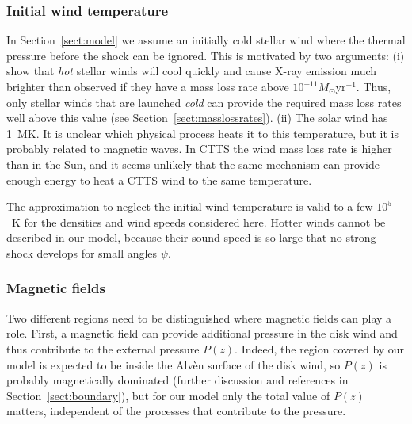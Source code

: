 \documentclass{emulateapj}
\begin{document}
\subsubsection{Initial wind temperature}
\label{sect:T_0}
In Section~\ref{sect:model} we assume an initially cold stellar wind where the thermal pressure before the shock can be ignored. This is motivated by two arguments: (i) \citet{2007IAUS..243..299M} show that {\it hot} stellar winds will cool quickly and cause X-ray emission much brighter than observed if they have a mass loss rate above $10^{-11}M_\odot\mathrm{ yr}^{-1}$. Thus, only stellar winds that are launched {\it cold} can provide the required mass loss rates well above this value (see Section~\ref{sect:masslossrates}). (ii) The solar wind has 1~MK. It is unclear which physical process heats it to this temperature, but it is probably related to magnetic waves. In CTTS the wind mass loss rate is higher than in the Sun, and it seems unlikely that the same mechanism can provide enough energy to heat a CTTS wind to the same temperature.

The approximation to neglect the initial wind temperature is valid to a few $10^5$~K for the densities and wind speeds considered here. Hotter winds cannot be described in our model, because their sound speed is so large that no strong shock develops for small angles $\psi$.

\subsubsection{Magnetic fields}
Two different regions need to be distinguished where magnetic fields can play a role. First, a magnetic field can provide additional pressure in the disk wind and thus contribute to the external pressure $P(z)$. Indeed, the region covered by our model is expected to be inside the Alv\`en surface of the disk wind, so $P(z)$ is probably magnetically dominated (further discussion and references in Section~\ref{sect:boundary}), but for our model only the total value of $P(z)$ matters, independent of the processes that contribute to the pressure. 
\end{document}
